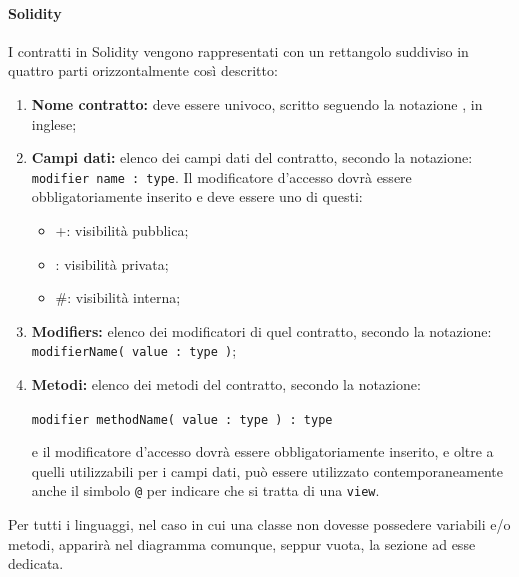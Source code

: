 \documentclass[NormeDiProgetto.tex]{subfiles}
\begin{document}
\paragraph{Solidity}
I contratti in Solidity vengono rappresentati con un rettangolo suddiviso in quattro parti orizzontalmente così descritto:
\begin{enumerate}
	\item \textbf{Nome contratto:} deve essere univoco, scritto seguendo la notazione , in inglese;
	\item \textbf{Campi dati:} elenco dei campi dati del contratto, secondo la notazione: \texttt{modifier name : type}. Il modificatore d'accesso dovrà essere obbligatoriamente inserito e deve essere uno di questi:
	\begin{itemize}
		\item +: visibilità pubblica;
		\item \textendash: visibilità privata;
		\item \#: visibilità interna;
	\end{itemize}
	\item \textbf{Modifiers:} elenco dei modificatori di quel contratto, secondo la notazione:
		\texttt{modifierName( value : type )};
	\item \textbf{Metodi:} elenco dei metodi del contratto, secondo la notazione:
	\begin{center}
		\texttt{modifier methodName( value : type ) : type}
	\end{center}
	e il modificatore d'accesso dovrà essere obbligatoriamente inserito, e oltre a quelli utilizzabili per i campi dati, può essere utilizzato contemporaneamente anche il simbolo \texttt{@} per indicare che si tratta di una \texttt{view}.
\end{enumerate}

Per tutti i linguaggi, nel caso in cui una classe non dovesse possedere variabili e/o metodi, apparirà nel diagramma comunque, seppur vuota, la sezione ad esse dedicata.
\end{document}
